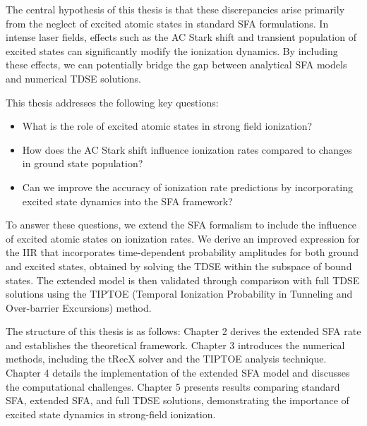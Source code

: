 The central hypothesis of this thesis is that these discrepancies arise primarily from the neglect of excited atomic states in standard SFA formulations. 
In intense laser fields, effects such as the AC Stark shift and transient population of excited states can significantly modify the ionization dynamics. By including these effects, we can potentially bridge the gap between analytical SFA models and numerical TDSE solutions.

This thesis addresses the following key questions:
\begin{itemize}
    \item What is the role of excited atomic states in strong field ionization?
    \item How does the AC Stark shift influence ionization rates compared to changes in ground state population?
    \item Can we improve the accuracy of ionization rate predictions by incorporating excited state dynamics into the SFA framework?
\end{itemize}

To answer these questions, we extend the SFA formalism to include the influence of excited atomic states on ionization rates. 
We derive an improved expression for the IIR that incorporates time-dependent probability amplitudes for both ground and excited states, obtained by solving the TDSE within the subspace of bound states. 
The extended model is then validated through comparison with full TDSE solutions using the TIPTOE (Temporal Ionization Probability in Tunneling and Over-barrier Excursions) method.

The structure of this thesis is as follows: Chapter 2 derives the extended SFA rate and establishes the theoretical framework. 
Chapter 3 introduces the numerical methods, including the tRecX solver and the TIPTOE analysis technique. Chapter 4 details the implementation of the extended SFA model and discusses the computational challenges. 
Chapter 5 presents results comparing standard SFA, extended SFA, and full TDSE solutions, demonstrating the importance of excited state dynamics in strong-field ionization.



